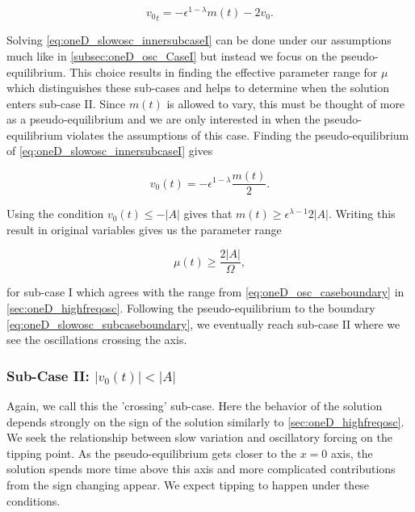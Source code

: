 \begin{equation}\label{eq:oneD_slowosc_innersubcaseI}
{v_0}_t= -\epsilon^{1-\lambda}m(t)-2v_0.
\end{equation}

Solving \eqref{eq:oneD_slowosc_innersubcaseI} can be done under our assumptions much like in \autoref{subsec:oneD_osc_CaseI} but instead we focus on the pseudo-equilibrium. This choice results in finding the effective parameter range for $\mu$ which distinguishes these sub-cases and helps to determine when the solution enters sub-case II. Since $m(t)$ is allowed to vary, this must be thought of more as a pseudo-equilibrium and we are only interested in when the pseudo-equilibrium violates the assumptions of this case. Finding the pseudo-equilibrium of \eqref{eq:oneD_slowosc_innersubcaseI} gives

\begin{equation*}
v_0(t)=-\epsilon^{1-\lambda}\frac{m(t)}{2}.
\end{equation*}

Using the condition $v_0(t)\le -|A|$ gives that $m(t)\ge \epsilon^{\lambda-1}2|A|$. Writing this result in original variables gives us the parameter range

\begin{equation}\label{eq:oneD_slowosc_subcaseboundary}
\mu(t)\ge \frac{2 |A|}{\Omega},
\end{equation}

for sub-case I which agrees with the range from \eqref{eq:oneD_osc_caseboundary} in \autoref{sec:oneD_highfreqosc}. Following the pseudo-equilibrium to the boundary \eqref{eq:oneD_slowosc_subcaseboundary}, we eventually reach sub-case II where we see the oscillations crossing the axis.

\subsubsection{Sub-Case II: $|v_0(t)|< |A|$}
\label{subsubsec:oneD_slowosc_subcaseII}

Again, we call this the 'crossing' sub-case. Here the behavior of the solution depends strongly on the sign of the solution similarly to \autoref{sec:oneD_highfreqosc}. We seek the relationship between slow variation and oscillatory forcing on the tipping point. As the pseudo-equilibrium gets closer to the $x=0$ axis, the solution spends more time above this axis and more complicated contributions from the sign changing appear. We expect tipping to happen under these conditions.

